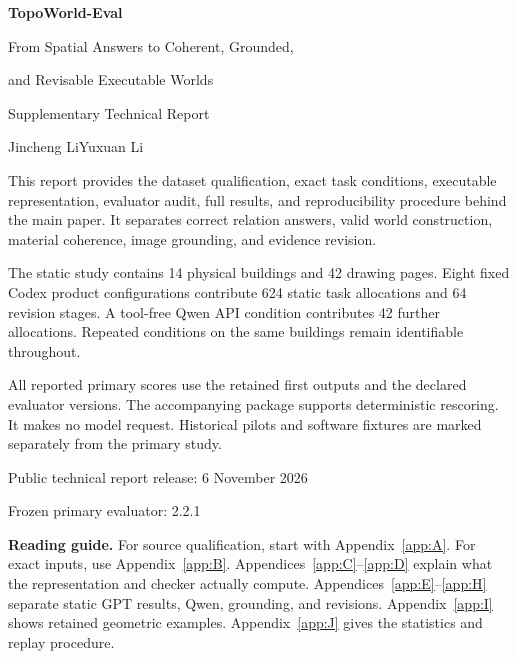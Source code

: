 \documentclass[11pt,letterpaper]{article}
\numberwithin{equation}{section}
\numberwithin{figure}{section}
\numberwithin{table}{section}
\begin{document}
\begin{titlepage}
\centering
\vspace*{1.15in}
{\LARGE\bfseries TopoWorld-Eval\par}
\vspace{.25in}
{\Large From Spatial Answers to Coherent, Grounded,\par and Revisable Executable Worlds\par}
\vspace{.4in}
{\large Supplementary Technical Report\par}
\vspace{.2in}
Jincheng Li\qquad Yuxuan Li\par
\vspace{.6in}
\begin{minipage}{.88\textwidth}
This report provides the dataset qualification, exact task conditions, executable representation, evaluator audit, full results, and reproducibility procedure behind the main paper. It separates correct relation answers, valid world construction, material coherence, image grounding, and evidence revision.

The static study contains 14 physical buildings and 42 drawing pages. Eight fixed Codex product configurations contribute 624 static task allocations and 64 revision stages. A tool-free Qwen API condition contributes 42 further allocations. Repeated conditions on the same buildings remain identifiable throughout.

All reported primary scores use the retained first outputs and the declared evaluator versions. The accompanying package supports deterministic rescoring. It makes no model request. Historical pilots and software fixtures are marked separately from the primary study.
\end{minipage}
\vfill
Public technical report release: 6 November 2026\par
Frozen primary evaluator: 2.2.1\par
\end{titlepage}
\tableofcontents
\vspace{.3in}
\textbf{Reading guide.} For source qualification, start with Appendix~\ref{app:A}. For exact inputs, use Appendix~\ref{app:B}. Appendices~\ref{app:C}--\ref{app:D} explain what the representation and checker actually compute. Appendices~\ref{app:E}--\ref{app:H} separate static GPT results, Qwen, grounding, and revisions. Appendix~\ref{app:I} shows retained geometric examples. Appendix~\ref{app:J} gives the statistics and replay procedure.
\end{document}
